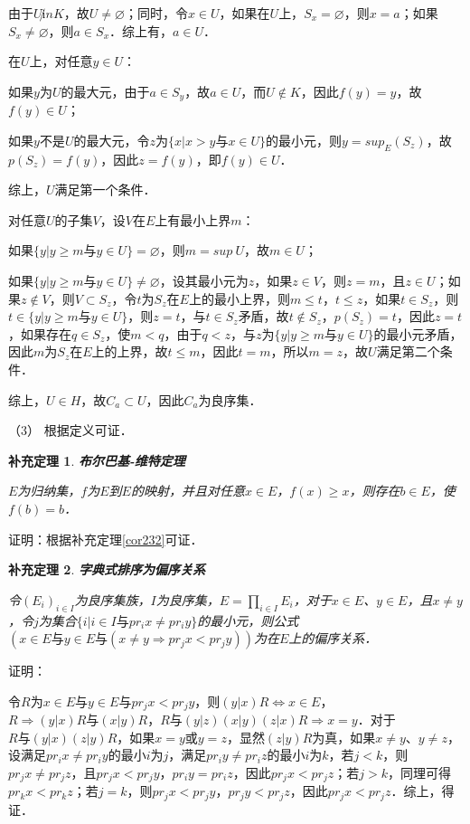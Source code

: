 \documentclass[12pt, a4paper, oneside]{book}
\newtheorem{cor}{补充定理}
\begin{document}
			\par
			由于$U\not in K$，故$U\neq \varnothing$；同时，令$x\in U$，如果在$U$上，$S_x=\varnothing$，则$x=a$；如果$S_x\neq\varnothing$，则$a\in S_x$．综上有，$a\in U$．
			\par
			在$U$上，对任意$y\in U$：
			\par
			如果$y$为$U$的最大元，由于$a\in S_y$，故$a\in U$，而$U \notin K$，因此$f(y)=y$，故$f(y)\in U$；
			\par
			如果$y$不是$U$的最大元，令$z$为$\{x|x>y\text{与}x\in U\}$的最小元，则$y=sup_E(S_z)$，故$p(S_z)=f(y)$，因此$z=f(y)$，即$f(y)\in U$．
			\par
			综上，$U$满足第一个条件．
			\par
			对任意$U$的子集$V$，设$V$在$E$上有最小上界$m$：
			\par
			如果$\{y|y\geq m\text{与}y\in U\}=\varnothing$，则$m=sup\ U$，故$m\in U$；
			\par
			如果$\{y|y\geq m\text{与}y\in U\}\neq\varnothing$，设其最小元为$z$，如果$z\in V$，则$z=m$，且$z\in U$；如果$z\notin V$，则$V\subset S_z$，令$t$为$S_z$在$E$上的最小上界，则$m\leq t$，$t\leq z$，如果$t\in S_z$，则$t\in \{y|y\geq m\text{与}y\in U\}$，则$z=t$，与$t\in S_z$矛盾，故$t\notin S_z$，$p(S_z)=t$，因此$z=t$，如果存在$q\in S_z$，使$m<q$，由于$q<z$，与$z$为$\{y|y \geq m\text{与}y\in U\}$的最小元矛盾，因此$m$为$S_z$在$E$上的上界，故$t\leq m$，因此$t=m$，所以$m=z$，故$U$满足第二个条件．
			\par
			综上，$U\in H$，故$C_a\subset U$，因此$C_a$为良序集．
			\par
			（3）	根据定义可证．
			
			\begin{cor}\label{cor233}
				\textbf{布尔巴基-维特定理}
				\par
				$E$为归纳集，$f$为$E$到$E$的映射，并且对任意$x\in E$，$f(x)\geq x$，则存在$b\in E$，使$f(b)=b$．
			\end{cor}
			证明：根据补充定理\ref{cor232}可证．
						
			\begin{cor}\label{cor234}
				\textbf{字典式排序为偏序关系}
				\par
				令$(E_i)_{i\in I}$为良序集族，$I$为良序集，$E=\prod\limits_{i\in I}E_i$，对于$x\in E$、$y\in E$，且$x\neq y$，令$j$为集合$\{i|i\in I\text{与}pr_ix\neq pr_iy\}$的最小元，则公式$(x\in E\text{与}y\in E\text{与}(x\neq y\Rightarrow pr_jx<pr_jy))$为在$E$上的偏序关系．
			\end{cor}
			证明：
			\par
			令$R$为$x\in E\text{与}y\in E\text{与}pr_jx<pr_jy$，则$(y|x)R\Leftrightarrow x\in E$，$R\Rightarrow (y|x)R\text{与}(x|y)R$，$R\text{与}(y|z)(x|y)(z|x)R\Rightarrow x=y$．对于$R\text{与}(y|x)(z|y)R$，如果$x=y\text{或}y=z$，显然$(z|y)R$为真，如果$x\neq y$、$y\neq z$，设满足$pr_ix\neq pr_iy$的最小$i$为$j$，满足$pr_iy\neq pr_iz$的最小$i$为$k$，若$j<k$，则$pr_jx\neq pr_jz$，且$pr_jx<pr_jy$，$pr_iy=pr_iz$，因此$pr_jx<pr_jz$；若$j>k$，同理可得$pr_kx<pr_kz$；若$j=k$，则$pr_jx<pr_jy$，$pr_jy<pr_jz$，因此$pr_jx<pr_jz$．综上，得证．
			
\end{document}
